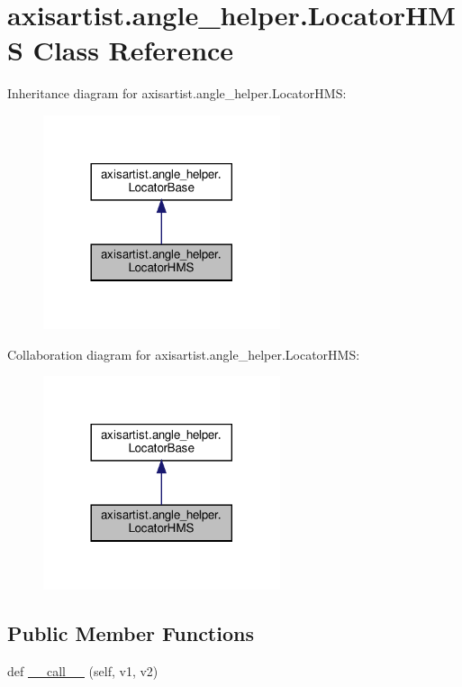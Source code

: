 \hypertarget{classaxisartist_1_1angle__helper_1_1LocatorHMS}{}\section{axisartist.\+angle\+\_\+helper.\+Locator\+H\+MS Class Reference}
\label{classaxisartist_1_1angle__helper_1_1LocatorHMS}


Inheritance diagram for axisartist.\+angle\+\_\+helper.\+Locator\+H\+MS\+:
\nopagebreak
\begin{figure}[H]
\begin{center}
\leavevmode
\includegraphics[width=197pt]{classaxisartist_1_1angle__helper_1_1LocatorHMS__inherit__graph}
\end{center}
\end{figure}


Collaboration diagram for axisartist.\+angle\+\_\+helper.\+Locator\+H\+MS\+:
\nopagebreak
\begin{figure}[H]
\begin{center}
\leavevmode
\includegraphics[width=197pt]{classaxisartist_1_1angle__helper_1_1LocatorHMS__coll__graph}
\end{center}
\end{figure}
\subsection*{Public Member Functions}
\begin{DoxyCompactItemize}
\item 
def \hyperlink{classaxisartist_1_1angle__helper_1_1LocatorHMS_aed44bd54a0e3c599c2ea1138ed634e68}{\+\_\+\+\_\+call\+\_\+\+\_\+} (self, v1, v2)
\end{DoxyCompactItemize}
